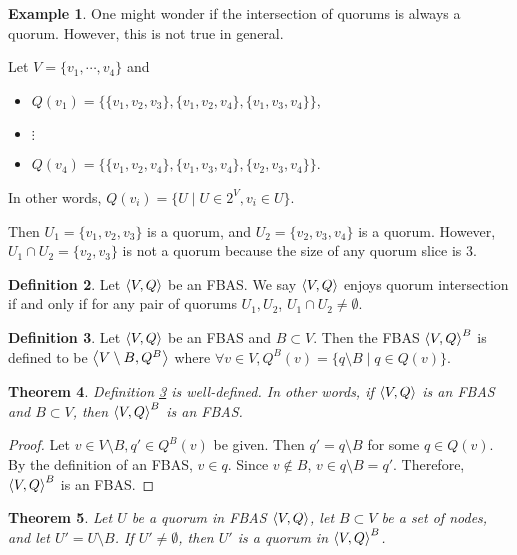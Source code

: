 \documentclass[12pt, psamsfonts]{amsart}
\newtheorem{thm}{Theorem}[section]
\theoremstyle{definition}
\newtheorem{defn}[thm]{Definition}
\newtheorem{exmp}[thm]{Example}
\theoremstyle{remark}
\numberwithin{equation}{section}
\begin{document}
\begin{exmp}
    One might wonder if the intersection of quorums is always a quorum.
    However, this is not true in general.

    Let $V = \{ v_1, \cdots, v_4 \}$ and
    \begin{itemize}
        \item
            $Q(v_1) = \{ \{ v_1, v_2, v_3 \}, \{ v_1, v_2, v_4 \}, \{ v_1, v_3, v_4 \} \}$,
        \item
            $\vdots$
        \item
            $Q(v_4) = \{ \{ v_1, v_2, v_4 \}, \{ v_1, v_3, v_4 \}, \{ v_2, v_3, v_4 \} \}$.
    \end{itemize}

    In other words, $Q(v_i) = \{ U \mid U \in 2^V, v_i \in U \}$.

    Then $U_1 = \{ v_1, v_2, v_3 \}$ is a quorum, and $U_2 = \{ v_2, v_3, v_4 \}$ is a quorum.
    However, $U_1 \cap U_2 = \{ v_2, v_3 \}$ is not a quorum because the size of any quorum slice is 3.
\end{exmp}

\begin{defn}
    Let $\ev{V, Q}$ be an FBAS.
    We say $\ev{V, Q}$ enjoys quorum intersection if and only if for any pair of quorums $U_1, U_2$, $U_1 \cap U_2 \ne \emptyset$.
\end{defn}

\begin{defn}\label{delete_fbas}
    Let $\ev{V, Q}$ be an FBAS and $B \subset V$.
    Then the FBAS $\ev{V, Q}^B$ is defined to be $\ev{V \setminus B, Q^B}$ where $\forall v \in V, Q^B(v) = \{ q \setminus B \mid q \in Q(v) \}$.
\end{defn}

\begin{thm}
    Definition \ref{delete_fbas} is well-defined.
    In other words, if $\ev{V, Q}$ is an FBAS and $B \subset V$, then $\ev{V, Q}^B$ is an FBAS.
\end{thm}

\begin{proof}
    Let $v \in V \setminus B, q' \in Q^B(v)$ be given.
    Then $q' = q \setminus B$ for some $q \in Q(v)$.
    By the definition of an FBAS, $v \in q$.
    Since $v \notin B$, $v \in q \setminus B = q'$.
    Therefore, $\ev{V, Q}^B$ is an FBAS.
\end{proof}

\begin{thm}\label{quorum_intersection_projected_system}
    Let $U$ be a quorum in FBAS $\ev{V, Q}$, let $B \subset V$ be a set of nodes, and let $U' = U \setminus B$.
    If $U' \ne \emptyset$, then $U'$ is a quorum in $\ev{V, Q}^B$.
\end{thm}
\end{document}
